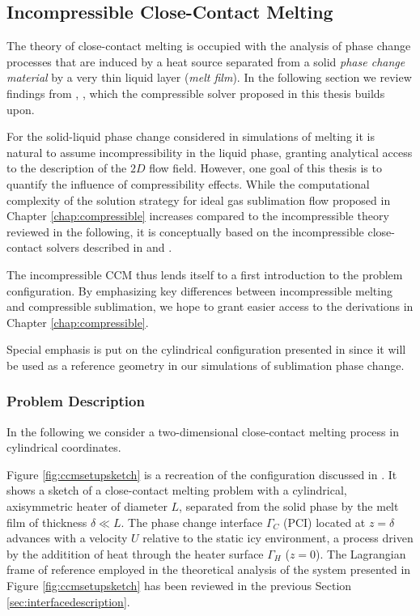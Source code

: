 \subsection{Incompressible Close-Contact Melting}\label{sec:incompccm}

The theory of close-contact melting is occupied with the analysis of phase change processes that are induced by a heat source separated from a solid \textit{ phase change material} by a very thin liquid layer (\textit{melt film}). In the following section we review findings from \cite{schuller2017spatially}, \cite{schuller2019icarus}, \cite{schuller2016curvilinearccm} which the compressible solver proposed in this thesis builds upon.

For the solid-liquid phase change considered in simulations of melting it is natural to assume incompressibility in the liquid phase, granting analytical access to the description of the $2D$ flow field. However, one goal of this thesis is to quantify the influence of compressibility effects. While the computational complexity of the solution strategy for ideal gas sublimation flow proposed in Chapter \ref{chap:compressible} increases compared to the incompressible theory reviewed in the following, it is conceptually based on the incompressible close-contact solvers described in \cite{schuller2017spatially} and \cite{schuller2016curvilinearccm}. 

The incompressible \gls{CCM} thus lends itself to a first introduction to the problem configuration.  By emphasizing key differences between incompressible melting and compressible sublimation, we hope to grant easier access to the derivations in Chapter \ref{chap:compressible}.

Special emphasis is put on the cylindrical configuration presented in \cite{schuller2019icarus} since it will be used as a reference geometry in our simulations of sublimation phase change. 

\subsubsection{Problem Description}
In the following we consider a two-dimensional close-contact melting process in cylindrical coordinates.

Figure \ref{fig:ccmsetupsketch} is a recreation of the configuration discussed in \cite{schuller2019icarus}. It shows a sketch of a close-contact melting problem with a cylindrical, axisymmetric heater of diameter $L$, separated from the solid phase by the melt film of thickness $\delta \ll L$. The phase change interface $\Gamma_C$ (\gls{PCI}) located at $z=\delta$ advances with a velocity $U$ relative to the static icy environment, a process driven by the additition of heat through the heater surface $\Gamma_H$ ($z=0$). The Lagrangian frame of reference employed in the theoretical analysis of the system presented in Figure \ref{fig:ccmsetupsketch} has been reviewed in the previous Section \ref{sec:interfacedescription}.


